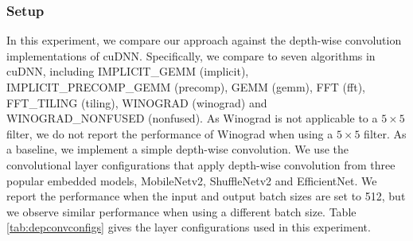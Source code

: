 \subsubsection{Setup} In this experiment, we compare our approach against the depth-wise
convolution implementations of cuDNN. Specifically, we compare to seven algorithms in cuDNN, including IMPLICIT\_GEMM (implicit),
IMPLICIT\_PRECOMP\_GEMM (precomp), GEMM (gemm), FFT (fft), FFT\_TILING (tiling), WINOGRAD (winograd) and WINOGRAD\_NONFUSED (nonfused). As
Winograd is not applicable  to a $5 \times 5$ filter, we do not report the performance of Winograd when using a $5 \times 5$ filter. As a
baseline, we implement a simple depth-wise convolution. We use the convolutional layer configurations that apply depth-wise convolution
from three popular embedded models, MobileNetv2, ShuffleNetv2 and EfficientNet. We report the performance when the input and output batch
sizes are set to 512, but we observe similar performance when using a different batch size. Table \ref{tab:depconvconfigs} gives the layer
configurations used in this experiment.






